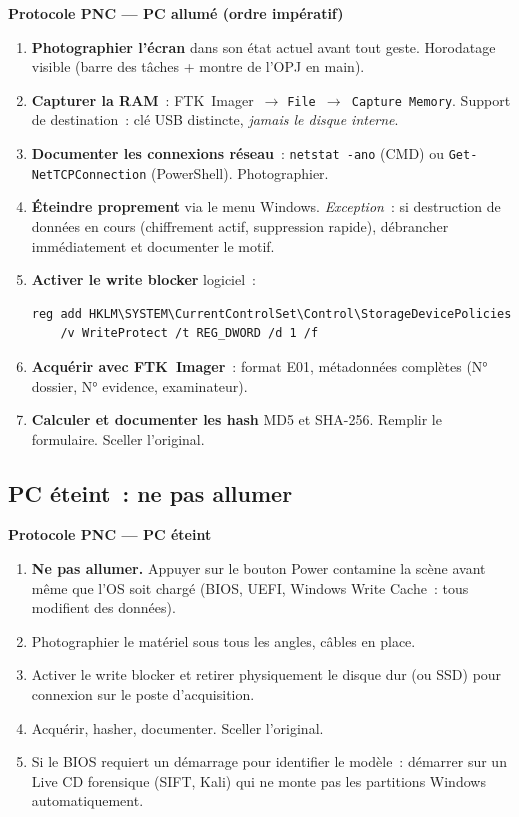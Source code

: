 \begin{boxPNC}
\textbf{Protocole PNC --- PC allumé (ordre impératif)}

\begin{enumerate}
    \item \textbf{Photographier l'écran} dans son état actuel avant tout geste.
          Horodatage visible (barre des tâches + montre de l'OPJ en main).
    \item \textbf{Capturer la RAM}~: FTK~Imager~$\to$
          \texttt{File~$\to$~Capture Memory}. Support de destination~:
          clé USB distincte, \emph{jamais le disque interne}.
    \item \textbf{Documenter les connexions réseau}~: \texttt{netstat -ano}
          (CMD) ou \texttt{Get-NetTCPConnection} (PowerShell). Photographier.
    \item \textbf{Éteindre proprement} via le menu Windows.
          \emph{Exception}~: si destruction de données en cours
          (chiffrement actif, suppression rapide), débrancher immédiatement
          et documenter le motif.
    \item \textbf{Activer le write blocker} logiciel~:
          \begin{lstlisting}[language=bash_forensique]
reg add HKLM\SYSTEM\CurrentControlSet\Control\StorageDevicePolicies
    /v WriteProtect /t REG_DWORD /d 1 /f
          \end{lstlisting}
    \item \textbf{Acquérir avec FTK~Imager}~: format E01, métadonnées
          complètes (N° dossier, N° evidence, examinateur).
    \item \textbf{Calculer et documenter les hash} MD5 et SHA-256.
          Remplir le formulaire. Sceller l'original.
\end{enumerate}
\end{boxPNC}

\subsection{PC éteint~: ne pas allumer}

\begin{boxPNC}
\textbf{Protocole PNC --- PC éteint}

\begin{enumerate}
    \item \textbf{Ne pas allumer.} Appuyer sur le bouton Power contamine
          la scène avant même que l'OS soit chargé (BIOS, UEFI, Windows
          Write Cache~: tous modifient des données).
    \item Photographier le matériel sous tous les angles, câbles en place.
    \item Activer le write blocker et retirer physiquement le disque dur
          (ou SSD) pour connexion sur le poste d'acquisition.
    \item Acquérir, hasher, documenter. Sceller l'original.
    \item Si le BIOS requiert un démarrage pour identifier le modèle~:
          démarrer sur un Live CD forensique (SIFT, Kali) qui ne monte
          pas les partitions Windows automatiquement.
\end{enumerate}
\end{boxPNC}

